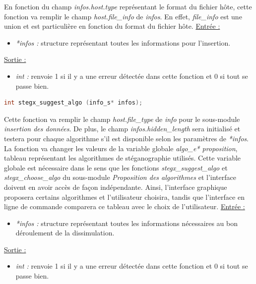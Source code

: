 \documentclass[11pt]{article}
\begin{document}
En fonction du champ \textit{infos.host.type} représentant le format du 
fichier hôte, cette fonction va remplir le champ \textit{host.file\_info} 
de \textit{infos}. En effet, \textit{file\_info} est une union et est 
particulière en fonction du format du fichier hôte. 
\newline
\underline{Entrée :} 
\begin{itemize}
\item \textit{*infos :} structure représentant toutes les informations pour 
l'insertion. 
\end{itemize}
\underline{Sortie :} 
\begin{itemize}
\item \textit{int :} renvoie 1 si il y a une erreur détectée dans cette 
fonction et 0 si tout se passe bien. 
\newline 
\end{itemize}


\begin{lstlisting}[language=c]
int stegx_suggest_algo (info_s* infos);
\end{lstlisting}

Cette fonction va remplir le champ \textit{host.file\_type} 
de \textit{info} pour le sous-module \textit{insertion des données}. 
De plus, le champ \textit{infos.hidden\_length} sera initialisé et testera 
pour chaque algorithme s'il est disponible selon les paramètres de \textit{*infos}. 
La fonction va changer les valeurs de la variable globale \textit{algo\_e* proposition}, 
tableau représentant les algorithmes de stéganographie utilisés. 
Cette variable globale est nécessaire dans le sens que les fonctions 
\textit{stegx\_suggest\_algo} et \textit{stegx\_choose\_algo} du sous-module 
\textit{Proposition des algorithmes} et l'interface doivent en avoir accès de 
façon indépendante. 
Ainsi, l'interface graphique proposera certains algorithmes et l'utilisateur 
choisira, tandis que l'interface en ligne de commande comparera ce tableau 
avec le choix de l'utilisateur. 
\newline
\underline{Entrée :}
\begin{itemize}
\item \textit{*infos :} structure représentant toutes les informations 
nécessaires au bon déroulement de la dissimulation. 
\end{itemize}
\underline{Sortie :} 
\begin{itemize}
\item \textit{int :} renvoie 1 si il y a une erreur détectée dans cette 
fonction et 0 si tout se passe bien. 
\newline 
\end{itemize}
\end{document}
